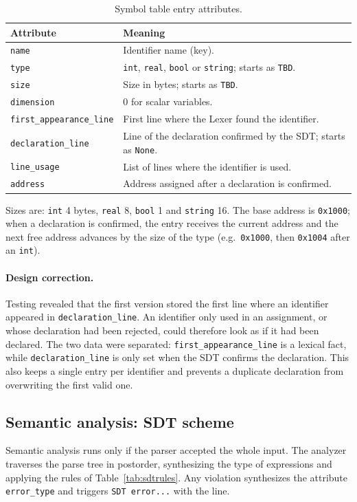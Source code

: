 \documentclass[11pt,a4paper]{article}
\begin{document}
\begin{table}[H]
\centering
\small
\begin{tabularx}{\textwidth}{@{}lX@{}}
\toprule
\textbf{Attribute} & \textbf{Meaning}\\
\midrule
\texttt{name} & Identifier name (key).\\
\texttt{type} & \texttt{int}, \texttt{real}, \texttt{bool} or \texttt{string}; starts as \texttt{TBD}.\\
\texttt{size} & Size in bytes; starts as \texttt{TBD}.\\
\texttt{dimension} & 0 for scalar variables.\\
\texttt{first\_appearance\_line} & First line where the Lexer found the identifier.\\
\texttt{declaration\_line} & Line of the declaration confirmed by the SDT; starts as \texttt{None}.\\
\texttt{line\_usage} & List of lines where the identifier is used.\\
\texttt{address} & Address assigned after a declaration is confirmed.\\
\bottomrule
\end{tabularx}
\caption{Symbol table entry attributes.}
\end{table}

Sizes are: \texttt{int} 4 bytes, \texttt{real} 8, \texttt{bool} 1 and \texttt{string} 16. The base address is \texttt{0x1000}; when a declaration is confirmed, the entry receives the current address and the next free address advances by the size of the type (e.g.\ \texttt{0x1000}, then \texttt{0x1004} after an \texttt{int}).

\paragraph{Design correction.} Testing revealed that the first version stored the first line where an identifier appeared in \texttt{declaration\_line}. An identifier only used in an assignment, or whose declaration had been rejected, could therefore look as if it had been declared. The two data were separated: \texttt{first\_appearance\_line} is a lexical fact, while \texttt{declaration\_line} is only set when the SDT confirms the declaration. This also keeps a single entry per identifier and prevents a duplicate declaration from overwriting the first valid one.

\subsection{Semantic analysis: SDT scheme}
\label{sec:sdt}
Semantic analysis runs only if the parser accepted the whole input. The analyzer traverses the parse tree in postorder, synthesizing the type of expressions and applying the rules of Table~\ref{tab:sdtrules}. Any violation synthesizes the attribute \texttt{error\_type} and triggers \texttt{SDT error...} with the line.
\end{document}
